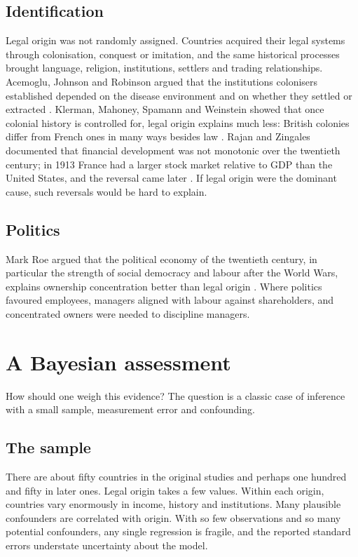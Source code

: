 \subsection{Identification}

Legal origin was not randomly assigned. Countries acquired their legal systems through colonisation, conquest or imitation, and the same historical processes brought language, religion, institutions, settlers and trading relationships. Acemoglu, Johnson and Robinson argued that the institutions colonisers established depended on the disease environment and on whether they settled or extracted \citep{acemoglu2001}. Klerman, Mahoney, Spamann and Weinstein showed that once colonial history is controlled for, legal origin explains much less: British colonies differ from French ones in many ways besides law \citep{klerman2011}. Rajan and Zingales documented that financial development was not monotonic over the twentieth century; in 1913 France had a larger stock market relative to GDP than the United States, and the reversal came later \citep{rajan2003}. If legal origin were the dominant cause, such reversals would be hard to explain.

\subsection{Politics}

Mark Roe argued that the political economy of the twentieth century, in particular the strength of social democracy and labour after the World Wars, explains ownership concentration better than legal origin \citep{roe2003}. Where politics favoured employees, managers aligned with labour against shareholders, and concentrated owners were needed to discipline managers.

\section{A Bayesian assessment}

How should one weigh this evidence? The question is a classic case of inference with a small sample, measurement error and confounding.

\subsection{The sample}

There are about fifty countries in the original studies and perhaps one hundred and fifty in later ones. Legal origin takes a few values. Within each origin, countries vary enormously in income, history and institutions. Many plausible confounders are correlated with origin. With so few observations and so many potential confounders, any single regression is fragile, and the reported standard errors understate uncertainty about the model.

